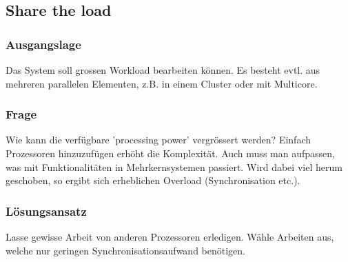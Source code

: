 \subsection{Share the load}

\subsubsection*{Ausgangslage}


Das System soll grossen Workload bearbeiten können. Es besteht evtl. aus mehreren parallelen Elementen, z.B. in einem Cluster oder mit Multicore.

\subsubsection*{Frage}


Wie kann die verfügbare 'processing power' vergrössert werden?
Einfach Prozessoren hinzuzufügen erhöht die Komplexität. Auch muss man aufpassen, was mit Funktionalitäten in Mehrkernsystemen passiert. Wird dabei viel herum geschoben, so ergibt sich erheblichen Overload (Synchronisation etc.).

\subsubsection*{Lösungsansatz}


Lasse gewisse Arbeit von anderen Prozessoren erledigen. Wähle Arbeiten aus, welche nur geringen Synchronisationsaufwand benötigen.
